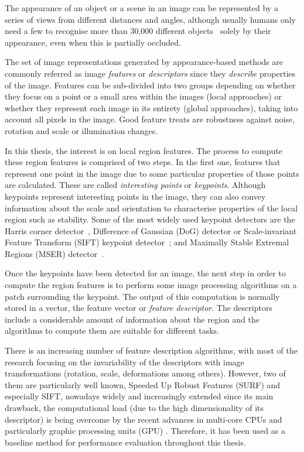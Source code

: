The appearance of an object or a scene in an image can be represented by a series of views from different distances and angles, although usually humans only need a few to recognise more than 30,000 different objects~\cite{biederman1987recognition} solely by their appearance, even when this is partially occluded. 

The set of image representations generated by appearance-based methods are commonly referred as image \textit{features} or \textit{descriptors} since they \textit{describe} properties of the image. Features can be sub-divided into two groups depending on whether they focus on a point or a small area within the images (local approaches) or whether they represent each image in its entirety (global approaches), taking into account all pixels in the image. Good feature treats are robustness against noise, rotation and scale or illumination changes. 

In this thesis, the interest is on local region features. The process to compute these region features is comprised of two steps. In the first one, features that represent one point in the image due to some particular properties of those points are calculated. These are called \textit{interesting points} or \textit{keypoints}. Although keypoints represent interesting points in the image, they can also convey information about the scale and orientation to characterise properties of the local region such as stability. Some of the most widely used keypoint detectors are the Harris corner detector~\cite{harris1988combined}, Difference of Gaussian (DoG) detector or Scale-invariant Feature Transform (SIFT) keypoint detector~\cite{lowe2004}; and Maximally Stable Extremal Regions (MSER) detector~\cite{matas2004robust}.

Once the keypoints have been detected for an image, the next step in order to compute the region features is to perform some image processing algorithms on a patch surrounding the keypoint. The output of this computation is normally stored in a vector, the feature vector or \textit{feature descriptor}. The descriptors include a considerable amount of information about the region and the algorithms to compute them are suitable for different tasks.

There is an increasing number of feature description algorithms, with most of the research focusing on the invariability of the descriptors with image transformations (rotation, scale, deformations among others). However, two of them are particularly well known, Speeded Up Robust Features (SURF) and especially SIFT, nowadays widely and increasingly extended since its main drawback, the computational load (due to the high dimensionality of its descriptor) is being overcome by the recent advances in multi-core CPUs and particularly graphic processing units (GPU) \cite{Wu2007}. Therefore, it has been used as a baseline method for performance evaluation throughout this thesis.


